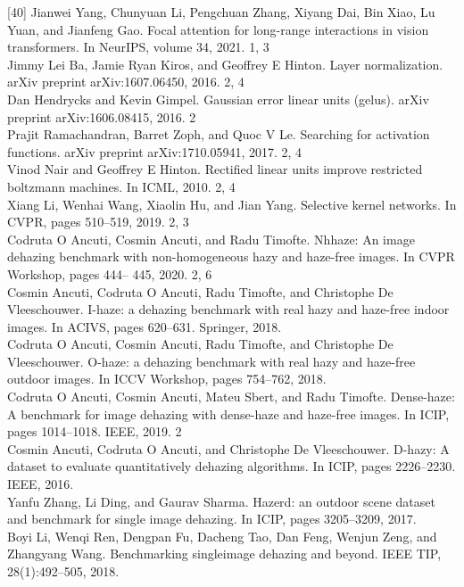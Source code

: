 \documentclass{article}
\begin{document}
[40] Jianwei Yang, Chunyuan Li, Pengchuan Zhang, Xiyang Dai, Bin Xiao, Lu Yuan, and Jianfeng Gao. Focal attention for long-range interactions in vision transformers. In NeurIPS, volume 34, 2021. 1, 3\\
[41] Jimmy Lei Ba, Jamie Ryan Kiros, and Geoffrey E Hinton. Layer normalization. arXiv preprint arXiv:1607.06450, 2016. 2, 4\\
[42] Dan Hendrycks and Kevin Gimpel. Gaussian error linear units (gelus). arXiv preprint arXiv:1606.08415, 2016. 2\\
[43] Prajit Ramachandran, Barret Zoph, and Quoc V Le. Searching for activation functions. arXiv preprint arXiv:1710.05941, 2017. 2, 4\\
[44] Vinod Nair and Geoffrey E Hinton. Rectified linear units improve restricted boltzmann machines. In ICML, 2010. 2, 4\\
[45] Xiang Li, Wenhai Wang, Xiaolin Hu, and Jian Yang. Selective kernel networks. In CVPR, pages 510–519, 2019. 2, 3\\
[46] Codruta O Ancuti, Cosmin Ancuti, and Radu Timofte. Nhhaze: An image dehazing benchmark with non-homogeneous hazy and haze-free images. In CVPR Workshop, pages 444– 445, 2020. 2, 6\\
[47] Cosmin Ancuti, Codruta O Ancuti, Radu Timofte, and Christophe De Vleeschouwer. I-haze: a dehazing benchmark with real hazy and haze-free indoor images. In ACIVS, pages 620–631. Springer, 2018.\\
[48] Codruta O Ancuti, Cosmin Ancuti, Radu Timofte, and Christophe De Vleeschouwer. O-haze: a dehazing benchmark with real hazy and haze-free outdoor images. In ICCV Workshop, pages 754–762, 2018.\\
[49] Codruta O Ancuti, Cosmin Ancuti, Mateu Sbert, and Radu Timofte. Dense-haze: A benchmark for image dehazing with dense-haze and haze-free images. In ICIP, pages 1014–1018. IEEE, 2019. 2\\
[50] Cosmin Ancuti, Codruta O Ancuti, and Christophe De Vleeschouwer. D-hazy: A dataset to evaluate quantitatively dehazing algorithms. In ICIP, pages 2226–2230. IEEE, 2016.\\
[51] Yanfu Zhang, Li Ding, and Gaurav Sharma. Hazerd: an outdoor scene dataset and benchmark for single image dehazing. In ICIP, pages 3205–3209, 2017.\\
[52] Boyi Li, Wenqi Ren, Dengpan Fu, Dacheng Tao, Dan Feng, Wenjun Zeng, and Zhangyang Wang. Benchmarking singleimage dehazing and beyond. IEEE TIP, 28(1):492–505, 2018.\\
\end{document}

